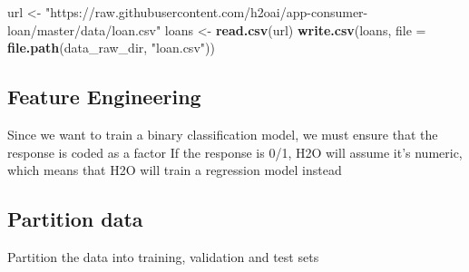 \documentclass[]{book}
\newenvironment{Shaded}{\begin{snugshade}}{\end{snugshade}}
\newcommand{\CommentTok}[1]{\textcolor[rgb]{0.56,0.35,0.01}{\textit{#1}}}
\newcommand{\DataTypeTok}[1]{\textcolor[rgb]{0.13,0.29,0.53}{#1}}
\newcommand{\DecValTok}[1]{\textcolor[rgb]{0.00,0.00,0.81}{#1}}
\newcommand{\FloatTok}[1]{\textcolor[rgb]{0.00,0.00,0.81}{#1}}
\newcommand{\KeywordTok}[1]{\textcolor[rgb]{0.13,0.29,0.53}{\textbf{#1}}}
\newcommand{\NormalTok}[1]{#1}
\newcommand{\OperatorTok}[1]{\textcolor[rgb]{0.81,0.36,0.00}{\textbf{#1}}}
\newcommand{\StringTok}[1]{\textcolor[rgb]{0.31,0.60,0.02}{#1}}
\begin{document}
\begin{Shaded}
\begin{Highlighting}[]
\NormalTok{url <-}\StringTok{ "https://raw.githubusercontent.com/h2oai/app-consumer-loan/master/data/loan.csv"}
\NormalTok{loans <-}\StringTok{ }\KeywordTok{read.csv}\NormalTok{(url)}
\KeywordTok{write.csv}\NormalTok{(loans, }\DataTypeTok{file =} \KeywordTok{file.path}\NormalTok{(data_raw_dir, }\StringTok{"loan.csv"}\NormalTok{))}
\end{Highlighting}
\end{Shaded}

\hypertarget{feature-engineering}{%
\subsection{Feature Engineering}\label{feature-engineering}}

Since we want to train a binary classification model,
we must ensure that the response is coded as a factor
If the response is 0/1, H2O will assume it's numeric,
which means that H2O will train a regression model instead

\begin{Shaded}
\end{Shaded}

\hypertarget{partition-data}{%
\subsection{Partition data}\label{partition-data}}

Partition the data into training, validation and test sets

\begin{Shaded}
\end{Shaded}
\end{document}

